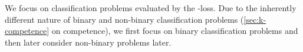\documentclass[../main.tex]{subfiles}
\begin{document}








We focus on classification problems evaluated by the \zeroone-loss. Due to the inherently different nature of binary and non-binary classification problems (\cf \ref{sec:k-competence} on competence), we first focus on binary classification problems and then later consider non-binary problems later.
\end{document}

